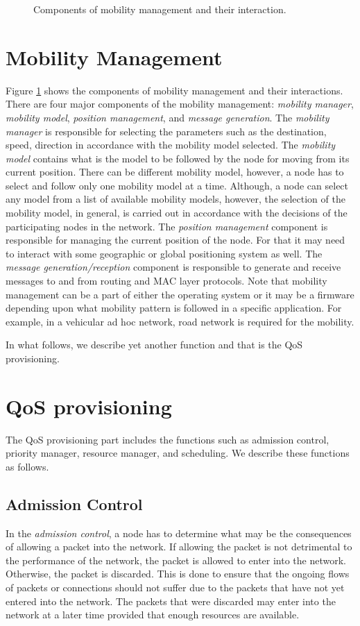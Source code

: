 \documentclass[10pt,times,epsfig,psfig,twocolumn,algorithm,algorithmic]{IEEEtran}
\begin{document}
\begin{figure}
\centerline{}
\caption{Components of mobility management and their interaction.}
\label{mobility}
\end{figure}


\section{Mobility Management}
Figure \ref{mobility} shows the components of mobility management and their interactions. There are four major components of the mobility management: {\em mobility manager}, {\em mobility model}, {\em position management}, and {\em message generation}. The {\em mobility manager} is responsible for selecting the parameters such as the destination, speed, direction in accordance with the mobility model selected. The {\em mobility model} contains what is the model to be followed by the node for moving from its current position. There can be different mobility model, however, a node has to select and follow only one mobility model at a time. Although, a node can select any model from a list of available mobility models, however, the selection of the mobility model, in general, is carried out in accordance with the decisions of the participating nodes in the network. The {\em position management} component is responsible for managing the current position of the node. For that it may need to interact with some geographic or global positioning system as well. The {\em message generation/reception} component is responsible to generate and receive messages to and from routing and MAC layer protocols. Note that mobility management can be a part of either the operating system or it may be a firmware depending upon what mobility pattern is followed in a specific application. For example, in a vehicular ad hoc network, road network is required for the mobility. 

In what follows, we describe yet another function and that is the QoS provisioning.
 
\section{QoS provisioning}
The QoS provisioning part includes the functions such as admission control, priority manager, resource manager, and scheduling. We describe these functions as follows. 

\subsection{Admission Control}
In the {\em admission control}, a node has to determine what may be the consequences of allowing a packet into the network. If allowing the packet is not detrimental to the performance of the network, the packet is allowed to enter into the network. Otherwise, the packet is discarded. This is done to ensure that the ongoing flows of packets or connections should not suffer due to the packets that have not yet entered into the network. The packets that were discarded may enter into the network at a later time provided that enough resources are available. 
\end{document}
